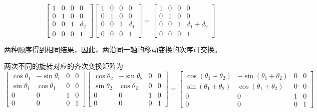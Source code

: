 \documentclass{homework}
\begin{document}
\begin{sol}
  \[
    \begin{bmatrix}
      1 & 0 & 0 & 0 \\
      0 & 1 & 0 & 0 \\
      0 & 0 & 1 & d_2 \\
      0 & 0 & 0 & 1 
    \end{bmatrix}
    \begin{bmatrix}
      1 & 0 & 0 & 0 \\
      0 & 1 & 0 & 0 \\
      0 & 0 & 1 & d_1 \\
      0 & 0 & 0 & 1 
    \end{bmatrix}
    =
    \begin{bmatrix}
      1 & 0 & 0 & 0 \\
      0 & 1 & 0 & 0 \\
      0 & 0 & 1 & d_1 + d_2 \\
      0 & 0 & 0 & 1 
    \end{bmatrix} 
  \]

  两种顺序得到相同结果，因此，两沿同一轴的移动变换的次序可交换。

  两次不同的旋转对应的齐次变换矩阵为
  \[
    \begin{bmatrix}
      \cos\theta_1 & -\sin\theta_1 & 0 & 0 \\
      \sin\theta_1 & \cos\theta_1 & 0 & 0 \\
      0 & 0 & 1 & 0 \\
      0 & 0 & 0 & 1 
    \end{bmatrix}
    \begin{bmatrix}
      \cos\theta_2 & -\sin\theta_2 & 0 & 0 \\
      \sin\theta_2 & \cos\theta_2 & 0 & 0 \\
      0 & 0 & 1 & 0 \\
      0 & 0 & 0 & 1 
    \end{bmatrix}
    =
    \begin{bmatrix}
      \cos(\theta_1 + \theta_2) & -\sin(\theta_1 + \theta_2) & 0 & 0 \\
      \sin(\theta_1 + \theta_2) & \cos(\theta_1 + \theta_2) & 0 & 0 \\
      0 & 0 & 1 & 0 \\
      0 & 0 & 0 & 1  
    \end{bmatrix}
  \]


\end{sol}
\end{document}
